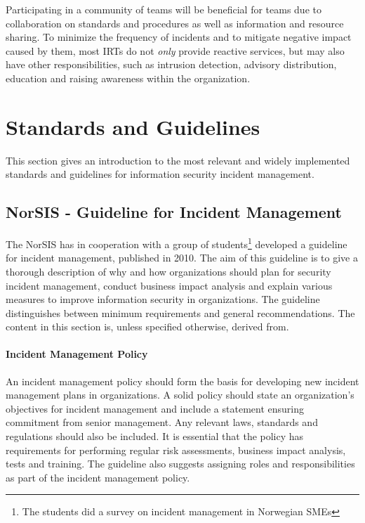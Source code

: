 Participating in a community of teams will be beneficial for teams due to collaboration on standards and procedures as well as information and resource sharing. To minimize the frequency of incidents and to mitigate negative impact caused by them, most \acp{IRT} do not \emph{only} provide reactive services, but may also have other responsibilities, such as intrusion detection, advisory distribution, education and raising awareness within the organization\cite{nist800-61}.  
  

\section{Standards and Guidelines}
This section gives an introduction to the most relevant and widely implemented standards and guidelines for information security incident management. 
\label{section:standardsandguidelines}







\subsection{NorSIS - Guideline for Incident Management}
\label{sec:NorSIS}
The \ac{NorSIS} has in cooperation with a group of students\footnote{The students did a survey on incident management in Norwegian \acsp{SME}\cite{sand2010hendelseshaandtering}} developed a guideline for incident management, published in 2010\cite{norsisveiledning}. The aim of this guideline is to give a thorough description of why and how organizations should plan for security incident management, conduct business impact analysis and explain various measures to improve information security in organizations. The guideline distinguishes between minimum requirements and general recommendations. The content in this section is, unless specified otherwise, derived from\cite{norsisveiledning}.

\paragraph{Incident Management Policy} 
An incident management policy should form the basis for developing new incident management plans in organizations. A solid policy should state an organization's objectives for incident management and include a statement ensuring commitment from senior management. Any relevant laws, standards and regulations should also be included. It is essential that the policy has requirements for performing regular risk assessments, business impact analysis, tests and training. The guideline also suggests assigning roles and responsibilities as part of the incident management policy.

